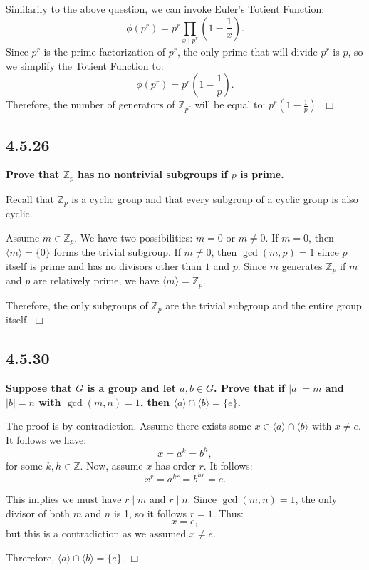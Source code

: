 \documentclass[11pt, a4paper]{article}
\begin{document}
Similarily to the above question, we can invoke Euler's Totient Function:
\[
  \phi(p^r) = p^r \prod_{x \mid p^r} \left ( 1 - \frac{1}{x} \right ).
\]
Since $p^r$ is the prime factorization of $p^r$, the only prime that will divide $p^r$ is $p$, so we simplify the Totient Function to:
\[
  \phi(p^r) = p^r \left ( 1 - \frac{1}{p} \right ).
\]
Therefore, the number of generators of $\mathbb{Z}_{p^r}$ will be equal to: $p^r \left ( 1 - \frac{1}{p} \right )$. $\Box$

\subsection{4.5.26}
\textbf{Prove that $\mathbb{Z}_{p}$ has no nontrivial subgroups if $p$ is prime.}

Recall that $\mathbb{Z}_{p}$ is a cyclic group and that every subgroup of a cyclic group is also cyclic. 

Assume $m \in \mathbb{Z}_{p}$. We have two possibilities: $m = 0$ or $m \neq 0$. If $m = 0$, then $\langle m \rangle = \{0\}$ forms the trivial subgroup. If $m \neq 0$, then $\gcd(m, p) = 1$ since $p$ itself is prime and has no divisors other than $1$ and $p$. Since $m$ generates $\mathbb{Z}_{p}$ if $m$ and $p$ are relatively prime, we have $\langle m \rangle = \mathbb{Z}_{p}$.

Therefore, the only subgroups of $\mathbb{Z}_{p}$ are the trivial subgroup and the entire group itself. $\Box$

\newpage

\subsection{4.5.30}
\textbf{Suppose that $G$ is a group and let $a, b \in G$. Prove that if $|a| = m$ and $|b| = n$ with $\gcd(m, n) = 1$, then $\langle a \rangle \cap \langle b \rangle = \{e\}$.}

The proof is by contradiction. Assume there exists some $x \in \langle a \rangle \cap \langle b \rangle$ with $x \neq e$. It follows we have:
\[
  x = a^{k} = b^{h},
\]
for some $k, h \in \mathbb{Z}$. Now, assume $x$ has order $r$. It follows:
\[
  x^r = a^{kr} = b^{hr} = e.
\]

This implies we must have $r \mid m$ and $r \mid n$. Since $\gcd(m, n) = 1$, the only divisor of both $m$ and $n$ is 1, so it follows $r = 1$. Thus:
\[
  x = e,
\]
but this is a contradiction as we assumed $x \neq e$.

Threrefore, $\langle a \rangle \cap \langle b \rangle = \{e\}$. $\Box$
\end{document}
